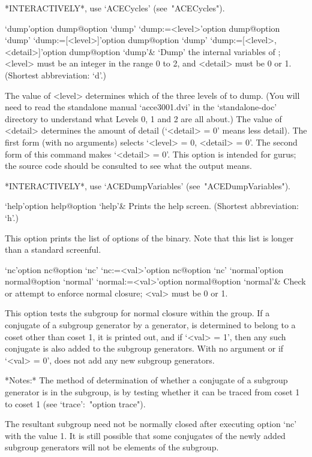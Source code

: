 *INTERACTIVELY*, use `ACECycles' (see~"ACECycles").

\>`dump'{option dump}@{option `dump'}
\>`dump:=<level>'{option dump}@{option `dump'}
\>`dump:=[<level>]'{option dump}@{option `dump'}
\>`dump:=[<level>, <detail>]'{option dump}@{option `dump'}&
`Dump' the internal variables of {\ACE}; <level> must be an integer in
the range 0 to 2, and <detail> must be 0 or 1.
(Shortest abbreviation: `d'.)

The value of <level> determines which of the three levels of {\ACE} to
dump. (You will need to read the standalone manual  `acce3001.dvi'  in
the `standalone-doc' directory to understand what Levels 0,  1  and  2
are all about.) The value of <detail> determines the amount of  detail
(`<detail> = 0' means less detail). The first form (with no arguments)
selects `<level> = 0, <detail> = 0'. The second form of  this  command
makes `<detail> = 0'. This option is intended for  gurus;  the  source
code should be consulted to see what the output means.

*INTERACTIVELY*, use `ACEDumpVariables' (see~"ACEDumpVariables").

\>`help'{option help}@{option `help'}&
Prints the {\ACE} help screen. (Shortest abbreviation: `h'.)

This option prints the list of options of the {\ACE} binary. Note that
this list is longer than a standard screenful.

\>`nc'{option nc}@{option `nc'}
\>`nc:=<val>'{option nc}@{option `nc'}
\>`normal'{option normal}@{option `normal'}
\>`normal:=<val>'{option normal}@{option `normal'}&
Check or attempt to enforce normal closure; <val> must be 0 or 1.

This option tests the subgroup for normal closure within the group. If
a conjugate of a subgroup generator by a generator, is  determined  to
belong to a coset other than coset 1, it is printed out, and if `<val>
=  1',  then  any  such  conjugate  is  also  added  to  the  subgroup
generators. With no argument or if `<val> = 0', {\ACE}  does  not  add
any new subgroup generators.

*Notes:*
The method of determination of  whether  a  conjugate  of  a  subgroup
generator is in the subgroup, is by testing whether it can  be  traced
from coset 1 to coset 1  (see  `trace':~"option trace").

The resultant subgroup need not be  normally  closed  after  executing
option `nc'  with  the  value  1.  It  is  still  possible  that  some
conjugates of the newly added subgroup generators will not be elements
of the subgroup.

